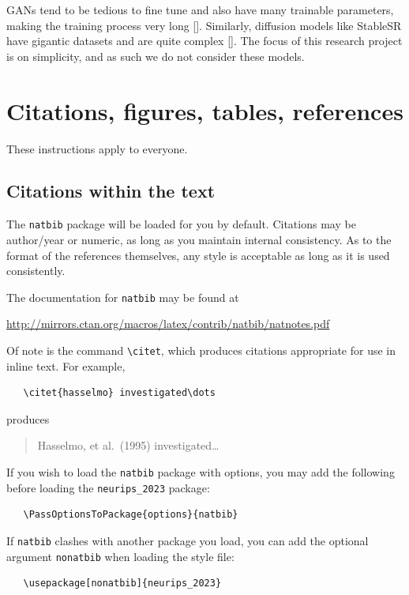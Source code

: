 \documentclass{article}
\begin{document}
GANs tend to be tedious to fine tune and also have many trainable parameters, making the training process very long []. Similarly, diffusion models like StableSR have gigantic datasets and are quite complex []. The focus of this research project is on simplicity, and as such we do not consider these models.


\section{Citations, figures, tables, references}
\label{others}


These instructions apply to everyone.


\subsection{Citations within the text}


The \verb+natbib+ package will be loaded for you by default.  Citations may be
author/year or numeric, as long as you maintain internal consistency.  As to the
format of the references themselves, any style is acceptable as long as it is
used consistently.


The documentation for \verb+natbib+ may be found at
\begin{center}
    \url{http://mirrors.ctan.org/macros/latex/contrib/natbib/natnotes.pdf}
\end{center}
Of note is the command \verb+\citet+, which produces citations appropriate for
use in inline text.  For example,
\begin{verbatim}
   \citet{hasselmo} investigated\dots
\end{verbatim}
produces
\begin{quote}
    Hasselmo, et al.\ (1995) investigated\dots
\end{quote}


If you wish to load the \verb+natbib+ package with options, you may add the
following before loading the \verb+neurips_2023+ package:
\begin{verbatim}
   \PassOptionsToPackage{options}{natbib}
\end{verbatim}


If \verb+natbib+ clashes with another package you load, you can add the optional
argument \verb+nonatbib+ when loading the style file:
\begin{verbatim}
   \usepackage[nonatbib]{neurips_2023}
\end{verbatim}
\end{document}
